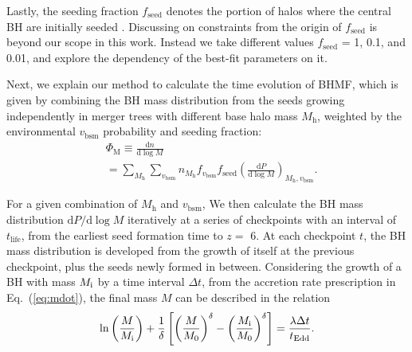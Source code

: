 \documentclass[nolinenumbers,preprint2,tighten]{aastex631}
\newcommand{\Mh}{M_\mathrm{h}}
\newcommand{\vbsm}{v_\mathrm{bsm}}
\newcommand{\tlife}{t_\mathrm{life}}
\newcommand{\fseed}{f_\mathrm{seed}}
\newcommand{\tEdd}{t_\mathrm{Edd}}
\newcommand{\Nt}{N_\mathrm{t}}
\newcommand{\D}{\mathrm{d}}
\begin{document}
\begin{CJK*}{UTF8}{gbsn}
Lastly, the seeding fraction $\fseed$ denotes the portion of halos where the central BH are initially seeded \citep{2009ApJ...696.1798T}.
Discussing on constraints from the origin of $\fseed$ is beyond our scope in this work. 
Instead we take different values $\fseed$ = 1, 0.1, and 0.01, 
and explore the dependency of the best-fit parameters on it.

Next, we explain our method to calculate the time evolution of BHMF, 
which is given by combining the BH mass distribution from the seeds growing independently in merger trees
with different base halo mass $\Mh$,
weighted by the environmental $\vbsm$ probability and seeding fraction: 
\begin{align}
& \Phi_\mathrm{M} \equiv \frac{\D n}{\D \log M}  \nonumber \\
& =\sum_{\Mh}\sum_{\vbsm} n_{\Mh} f_{\vbsm} {\fseed} \left(\frac{\D P}{\D \log M}\right)_{\Mh, \vbsm}.
\end{align}

For a given combination of $\Mh$ and $\vbsm$, 
We then calculate the BH mass distribution $\D P/\D\log M$ iteratively 
at a series of checkpoints with an interval of $\tlife$, 
from the earliest seed formation time to $z=$ 6. 
At each checkpoint $t$, the BH mass distribution is developed from the growth of itself 
at the previous checkpoint, plus the seeds newly formed in between.
Considering the growth of a BH with mass $M_{\rm i}$ by a time interval $\Delta t$, 
from the accretion rate prescription in Eq.~(\ref{eq:mdot}), the final mass $M$ can be described in the relation 
\begin{equation}
  \label{eq:mi2m}
  \ln \left(\frac{M} {M_{\rm i}}\right) + \frac{1}{\delta} 
  \left[ \left(\frac{M}{M_0}\right)^\delta - \left(\frac{M_{\rm i}}{M_0}\right)^\delta \right]
  = \frac{\lambda \Delta t}{\tEdd}.
\end{equation}


\end{CJK*}
\end{document}
